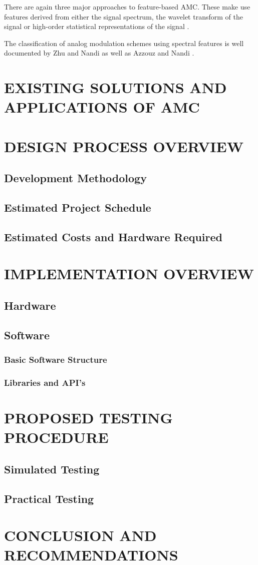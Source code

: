 \documentclass[10pt,twocolumn]{witseiepaper}
\begin{document}
	There are again three major approaches to feature-based AMC. These make use features derived from either the signal spectrum, the wavelet transform of the signal or high-order statistical representations of the signal \cite{zhu2014automatic}. 
	
	The classification of analog modulation schemes using spectral features is well documented by Zhu and Nandi \cite{zhu2014automatic} as well as Azzouz and Nandi \cite{azzouz2013automatic}.
	

\section{EXISTING SOLUTIONS AND APPLICATIONS OF AMC}

\section{DESIGN PROCESS OVERVIEW}
	\subsection{Development Methodology}
	\subsection{Estimated Project Schedule}
	\subsection{Estimated Costs and Hardware Required}

\section{IMPLEMENTATION OVERVIEW}
	\subsection{Hardware}
	\subsection{Software}
		\subsubsection{Basic Software Structure}
		\subsubsection{Libraries and API's}

\section{PROPOSED TESTING PROCEDURE}
	\subsection{Simulated Testing}
	\subsection{Practical Testing}

\section{CONCLUSION AND RECOMMENDATIONS}



 
\end{document}
